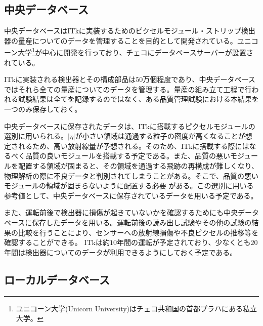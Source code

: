 \subsection{中央データベース}
\label{sec:ITkPD}

中央データベースはITkに実装するためのピクセルモジュール・ストリップ検出器の量産についてのデータを管理することを目的として開発されている。ユニコーン大学\footnote{ユニコーン大学(Unicorn University)はチェコ共和国の首都プラハにある私立大学\cite{unicorn}。}が中心に開発を行っており、チェコにデータベースサーバーが設置されている。

ITkに実装される検出器とその構成部品は$50$万個程度であり、中央データベースではそれら全ての量産についてのデータを管理する。量産の組み立て工程で行われる試験結果は全てを記録するのではなく、ある品質管理試験における本結果を一つのみ保存しておく。

中央データベースに保存されたデータは、ITkに搭載するピクセルモジュールの選別に用いられる。$|\eta|$が小さい領域は通過する粒子の密度が高くなることが想定されるため、高い放射線量が予想される。そのため、ITkに搭載する際にはなるべく品質の良いモジュールを搭載する予定である。また、品質の悪いモジュールを配置する領域が固まると、その領域を通過する飛跡の再構成が難しくなり、物理解析の際に不良データと判別されてしまうことがある。そこで、品質の悪いモジュールの領域が固まらないように配置する必要
がある。この選別に用いる参考値として、中央データベースに保存されているデータを用いる予定である。

また、運転前後で検出器に損傷が起きていないかを確認するためにも中央データベースに保存したデータを用いる。運転前後の読み出し試験やその他の試験の結果の比較を行うことにより、センサーへの放射線損傷や不良ピクセルの推移等を確認することができる。
ITkは約$10$年間の運転が予定されており、少なくとも$20$年間は検出器についてのデータが利用できるようにしておく予定である。



\subsection{ローカルデータベース}
\label{sec:LocalDB}

